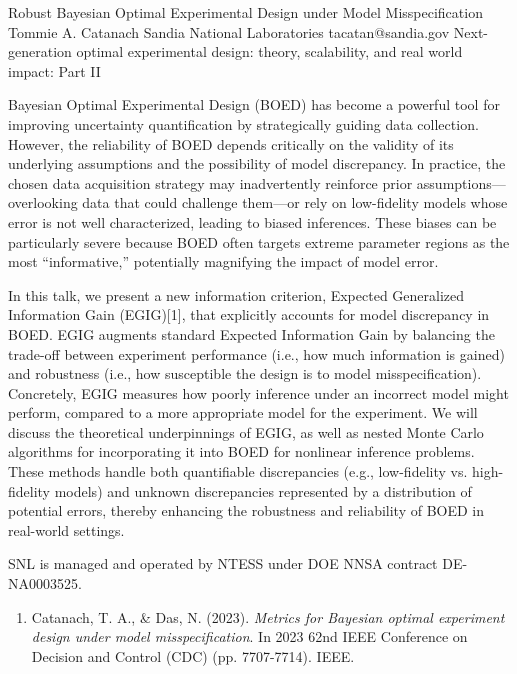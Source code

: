 \begin{talk}
  {Robust Bayesian Optimal Experimental Design under Model Misspecification}%
  {Tommie A. Catanach}%
  {Sandia National Laboratories}%
  {tacatan@sandia.gov}%
  {}%
  {Next-generation optimal experimental design: theory, scalability, and real world impact: Part II}%
    
   
Bayesian Optimal Experimental Design (BOED) has become a powerful tool for improving uncertainty quantification by strategically guiding data collection. However, the reliability of BOED depends critically on the validity of its underlying assumptions and the possibility of model discrepancy. In practice, the chosen data acquisition strategy may inadvertently reinforce prior assumptions—overlooking data that could challenge them—or rely on low-fidelity models whose error is not well characterized, leading to biased inferences. These biases can be particularly severe because BOED often targets extreme parameter regions as the most “informative,” potentially magnifying the impact of model error.

In this talk, we present a new information criterion, Expected Generalized Information Gain (EGIG)[1], that explicitly accounts for model discrepancy in BOED. EGIG augments standard Expected Information Gain by balancing the trade-off between experiment performance (i.e., how much information is gained) and robustness (i.e., how susceptible the design is to model misspecification). Concretely, EGIG measures how poorly inference under an incorrect model might perform, compared to a more appropriate model for the experiment. We will discuss the theoretical underpinnings of EGIG, as well as nested Monte Carlo algorithms for incorporating it into BOED for nonlinear inference problems. These methods handle both quantifiable discrepancies (e.g., low-fidelity vs. high-fidelity models) and unknown discrepancies represented by a distribution of potential errors, thereby enhancing the robustness and reliability of BOED in real-world settings.

SNL is managed and operated by NTESS under DOE NNSA contract DE-NA0003525. 
\medskip

\begin{enumerate}
 \item[{[1]}] Catanach, T. A., \& Das, N. (2023). {\it Metrics for Bayesian optimal experiment design under model misspecification}. In 2023 62nd IEEE Conference on Decision and Control (CDC) (pp. 7707-7714). IEEE.
\end{enumerate}
\end{talk}
